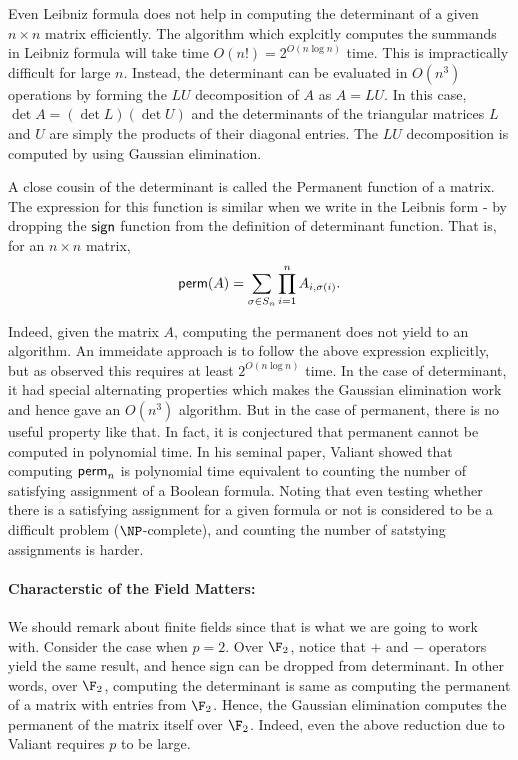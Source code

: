 Even Leibniz formula does not help in computing the determinant of a given $n \times n$ matrix efficiently. The algorithm which explcitly computes the summands in Leibniz formula will take time $O(n!) = 2^{O(n \log n)}$ time.
This is impractically difficult for large $n$. 
Instead, the determinant can be evaluated in $O(n^3)$ operations by forming the $LU$ decomposition of $A$ as $A = LU$. In this case, $\det A = (\det L)(\det U)$ and the determinants of the triangular matrices $L$ and $U$ are simply the products of their diagonal entries. The $LU$ decomposition is computed by using Gaussian elimination. 

A close cousin of the determinant is called the {\sf Permanent} function of a matrix. The expression for this function is similar when we write in the Leibnis form - by dropping the  ${\sf sign}$ function from the definition of determinant function. That is, for an $n \times n$ matrix,
\[{\sf perm}(A) = \sum_{\sigma\in S_n}\prod_{i=1}^n A_{i,\sigma(i)}.\]

Indeed, given the matrix $A$, computing the permanent does not yield to an algorithm. An immeidate approach is to follow the above expression explicitly, but as observed this requires at least $2^{O(n \log n)}$ time. In the case of determinant, it had special alternating properties which makes the Gaussian elimination work and hence gave an $O(n^3)$ algorithm. But in the case of permanent, there is no useful property like that. In fact, it is conjectured that permanent cannot be computed in polynomial time. In his seminal paper, Valiant showed that computing ${\sf perm}_n$ is polynomial time equivalent to counting the number of
satisfying assignment of a Boolean formula. Noting that even testing whether there is a satisfying assignment for a given formula or not is considered to be a difficult problem ($\NP$-complete), and counting the number of satstying assignments is harder. \\[-8mm]

\paragraph{Characterstic of the Field Matters:}
We should remark about finite fields since that is what we are going to work with. Consider the case when $p=2$. Over $\F_2$, notice that $+$ and $-$ operators yield the same result, and hence sign can be dropped from determinant. In other words, over $\F_2$, computing the determinant is same as computing the permanent of a matrix with entries from $\F_2$. Hence, the Gaussian elimination computes the permanent of the matrix itself over $\F_2$. Indeed, even the above reduction due to Valiant requires $p$ to be large. \\[-8mm]


